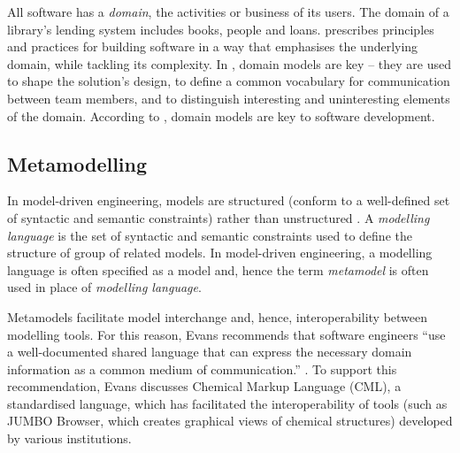 All software has a \emph{domain}, the activities or business of its users. The domain of a library's lending system includes books, people and loans. \cite{evans04domain} prescribes principles and practices for building software in a way that emphasises the underlying domain, while tackling its complexity. In \cite{evans04domain}, domain models are key -- they are used to shape the solution's design, to define a common vocabulary for communication between team members, and to distinguish interesting and uninteresting elements of the domain. According to \cite{evans04domain}, domain models are key to software development. 



\subsection{Metamodelling}
In model-driven engineering, models are structured (conform to a well-defined set of syntactic and semantic constraints) rather than unstructured \cite{kolovos09thesis}. A \emph{modelling language} is the set of syntactic and semantic constraints used to define the structure of group of related models. In model-driven engineering, a modelling language is often specified as a model and, hence the term \emph{metamodel} is often used in place of \emph{modelling language}.

Metamodels facilitate model interchange and, hence, interoperability between modelling tools.  For this reason, Evans recommends that software engineers ``use a well-documented shared language that can express the necessary domain information as a common medium of communication.'' \cite[pg377]{evans04domain}. To support this recommendation, Evans discusses Chemical Markup Language (CML), a standardised language, which has facilitated the interoperability of tools (such as JUMBO Browser, which creates graphical views of chemical structures) developed by various institutions.

